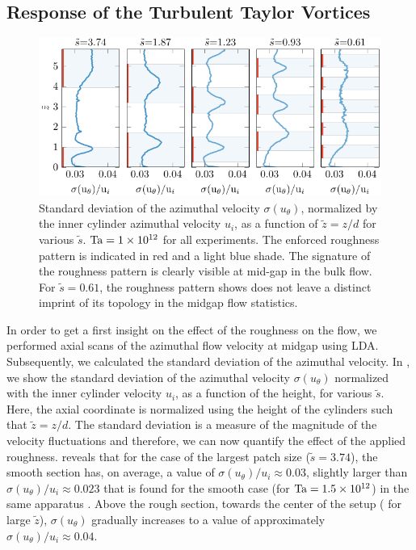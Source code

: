 \subsection{Response of the Turbulent Taylor Vortices}\label{sec:resultsec}
\begin{figure}
\centering
\includegraphics{fig3_ldaFluctuations.pdf}
\caption{%
Standard deviation of the azimuthal velocity $\sigma(u_\theta)$, normalized by the inner cylinder azimuthal velocity $u_i$, as a function of $\tilde {z}=z/d$ for various $\tilde{s}$.
$\text{Ta}=\num{1e12}$ for all experiments.
The enforced roughness pattern is indicated in red and a light blue shade.
The signature of the roughness pattern is clearly visible at mid-gap in the bulk flow. For $\tilde s=0.61$, the roughness pattern shows does not leave a distinct imprint of its topology in the midgap flow statistics.}
\label{fig:explda}
\end{figure}
In order to get a first insight on the effect of the roughness on the flow, we performed axial scans of the azimuthal flow velocity at midgap using LDA.
Subsequently, we calculated the standard deviation of the azimuthal velocity. In , we show the standard deviation of the azimuthal velocity $\sigma(u_\theta)$ normalized with the inner cylinder velocity $u_i$, as a function of the height, for various $\tilde s$. Here, the axial coordinate is normalized using the height of the cylinders such that $\tilde z = z/d$. The standard deviation is a measure of the magnitude of the velocity fluctuations and therefore, we can now quantify the effect of the applied roughness.  reveals that for the case of the largest patch size ($\tilde s=3.74$), the smooth section has, on average, a value of $\sigma(u_\theta)/u_i  \approx 0.03$, slightly larger than $\sigma(u_\theta)/u_i \approx 0.023$ that is found for the smooth case (for $\text{Ta}=\num{1.5e12}$) in the same apparatus \citep{vanGils2012}. Above the rough section, towards the center of the setup ( for large $\tilde z$), $\sigma(u_\theta)$ gradually increases to a value of approximately $\sigma(u_\theta)/u_i \approx 0.04$.
